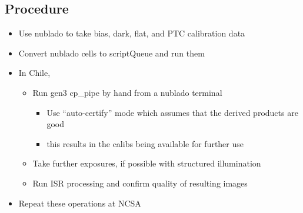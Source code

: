 \subsection{Procedure}
\begin{itemize}
\item Use nublado to take bias, dark, flat, and PTC calibration data
\item Convert nublado cells to \gls{scriptQueue} and run them
\item In Chile,
  \begin{itemize}
  \item Run gen3 \gls{cp_pipe} by hand from a nublado terminal
    \begin{itemize}
    \item Use ``auto-certify'' mode which assumes that the derived products are good
    \item \Nb this results in the calibs being available for further use
    \end{itemize}
  \item Take further exposures, if possible with structured illumination
  \item Run \gls{ISR} processing and confirm quality of resulting images
  \end{itemize}
\item Repeat these operations at NCSA
\end{itemize}
